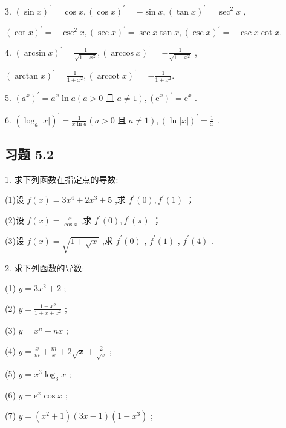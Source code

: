 3. \({\left( \sin x\right) }^{\prime } = \cos x,{\left( \cos x\right) }^{\prime } =  - \sin x,{\left( \tan x\right) }^{\prime } = {\sec }^{2}x\) ,

\({\left( \cot x\right) }^{\prime } =  - {\csc }^{2}x,{\left( \sec x\right) }^{\prime } = \sec x\tan x,{\left( \csc x\right) }^{\prime } =  - \csc x\cot x.\)

4. \({\left( \arcsin x\right) }^{\prime } = \frac{1}{\sqrt{1 - {x}^{2}}},{\left( \arccos x\right) }^{\prime } =  - \frac{1}{\sqrt{1 - {x}^{2}}}\) ,

\({\left( \arctan x\right) }^{\prime } = \frac{1}{1 + {x}^{2}},{\left( \operatorname{arccot}x\right) }^{\prime } =  - \frac{1}{1 + {x}^{2}}.\)

5. \({\left( {a}^{x}\right) }^{\prime } = {a}^{x}\ln a\left( {a > 0\text{ 且 }a \neq  1}\right) ,{\left( {\mathrm{e}}^{x}\right) }^{\prime } = {\mathrm{e}}^{x}\) .

6. \({\left( {\log }_{a}\left| x\right| \right) }^{\prime } = \frac{1}{x\ln a}\left( {a > 0\text{ 且 }a \neq  1}\right) ,{\left( \ln \left| x\right| \right) }^{\prime } = \frac{1}{x}\) .

\subsection{习题 5.2}

1. 求下列函数在指定点的导数:

(1)设 \(f\left( x\right)  = 3{x}^{4} + 2{x}^{3} + 5\) ,求 \({f}^{\prime }\left( 0\right) ,{f}^{\prime }\left( 1\right)\) ；

(2)设 \(f\left( x\right)  = \frac{x}{\cos x}\) ,求 \({f}^{\prime }\left( 0\right) ,{f}^{\prime }\left( \pi \right)\) ；

(3)设 \(f\left( x\right)  = \sqrt{1 + \sqrt{x}}\) ,求 \({f}^{\prime }\left( 0\right)\) , \({f}^{\prime }\left( 1\right)\) , \({f}^{\prime }\left( 4\right)\) .

2. 求下列函数的导数:

(1) \(y = 3{x}^{2} + 2\) ;

(2) \(y = \frac{1 - {x}^{2}}{1 + x + {x}^{2}}\) ;

(3) \(y = {x}^{n} + {nx}\) ;

(4) \(y = \frac{x}{m} + \frac{m}{x} + 2\sqrt{x} + \frac{2}{\sqrt{x}}\) ;

(5) \(y = {x}^{3}{\log }_{3}x\) ;

(6) \(y = {\mathrm{e}}^{x}\cos x\) ;

(7) \(y = \left( {{x}^{2} + 1}\right) \left( {{3x} - 1}\right) \left( {1 - {x}^{3}}\right)\) ;

